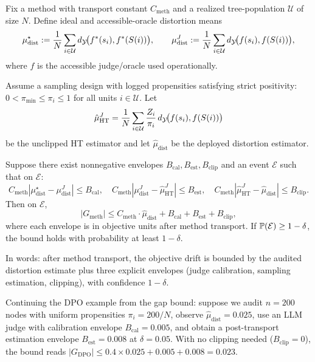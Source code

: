 \begin{theorem}\label{thm:e2e}
Fix a method with transport constant $C_{\mathrm{meth}}$ and a realized tree-population $\mathcal{U}$ of size $N$. Define ideal and accessible-oracle distortion means
\[
\mu_{\mathrm{dist}}^{\star}:=\frac{1}{N}\sum_{i\in\mathcal{U}} d_{\mathcal{Y}}\!\big(f^\ast(s_i),f^\ast(S(i))\big),\qquad
\mu_{\mathrm{dist}}^{J}:=\frac{1}{N}\sum_{i\in\mathcal{U}} d_{\mathcal{Y}}\!\big(f(s_i),f(S(i))\big),
\]
where $f$ is the accessible judge/oracle used operationally.

Assume a sampling design with logged propensities satisfying strict positivity: $0 < \pi_{\min} \le \pi_i \le 1$ for all units $i \in \mathcal{U}$. Let
\[
\hat{\mu}_{\mathrm{HT}}^{J}=\frac{1}{N}\sum_{i\in\mathcal{U}}\frac{Z_i}{\pi_i}\,d_{\mathcal{Y}}\!\big(f(s_i),f(S(i))\big)
\]
be the unclipped HT estimator and let $\hat{\mu}_{\mathrm{dist}}$ be the deployed distortion estimator.

Suppose there exist nonnegative envelopes $B_{\mathrm{cal}}, B_{\mathrm{est}}, B_{\mathrm{clip}}$ and an event $\mathcal{E}$ such that on $\mathcal{E}$:
\[
C_{\mathrm{meth}}\!\left|\mu_{\mathrm{dist}}^{\star}-\mu_{\mathrm{dist}}^{J}\right|\le B_{\mathrm{cal}},\quad
C_{\mathrm{meth}}\!\left|\mu_{\mathrm{dist}}^{J}-\hat{\mu}_{\mathrm{HT}}^{J}\right|\le B_{\mathrm{est}},\quad
C_{\mathrm{meth}}\!\left|\hat{\mu}_{\mathrm{HT}}^{J}-\hat{\mu}_{\mathrm{dist}}\right|\le B_{\mathrm{clip}}.
\]
Then on $\mathcal{E}$,
\[
|G_{\mathrm{meth}}| \le C_{\mathrm{meth}} \cdot \hat{\mu}_{\mathrm{dist}} + B_{\mathrm{cal}} + B_{\mathrm{est}} + B_{\mathrm{clip}},
\]
where each envelope is in objective units after method transport. If $\mathbb{P}(\mathcal{E})\ge 1-\delta$, the bound holds with probability at least $1-\delta$.
\end{theorem}

\noindent In words: after method transport, the objective drift is bounded by the audited distortion estimate plus three explicit envelopes (judge calibration, sampling estimation, clipping), with confidence $1-\delta$.

Continuing the DPO example from the gap bound: suppose we audit $n = 200$ nodes with uniform propensities $\pi_i = 200/N$, observe $\hat{\mu}_{\mathrm{dist}} = 0.025$, use an LLM judge with calibration envelope $B_{\mathrm{cal}} = 0.005$, and obtain a post-transport estimation envelope $B_{\mathrm{est}} = 0.008$ at $\delta = 0.05$. With no clipping needed ($B_{\mathrm{clip}} = 0$), the bound reads $|G_{\mathrm{DPO}}| \le 0.4 \times 0.025 + 0.005 + 0.008 = 0.023$.

